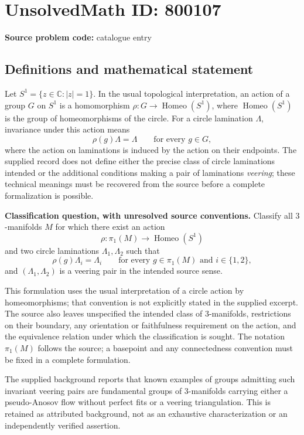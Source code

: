 \documentclass[11pt]{article}
\newcommand{\C}{\mathbb{C}}
\begin{document}
\section*{UnsolvedMath ID: 800107}
\textbf{Source problem code:} catalogue entry
\subsection{Definitions and mathematical statement}
Let \(S^1=\{z\in\C:|z|=1\}\). In the usual topological interpretation, an action of a group \(G\) on \(S^1\) is a homomorphism \(\rho:G\to\operatorname{Homeo}(S^1)\), where \(\operatorname{Homeo}(S^1)\) is the group of homeomorphisms of the circle. For a circle lamination \(\Lambda\), invariance under this action means
\[
\rho(g)\Lambda=\Lambda\qquad\text{for every }g\in G,
\]
where the action on laminations is induced by the action on their endpoints. The supplied record does not define either the precise class of circle laminations intended or the additional conditions making a pair of laminations \emph{veering}; these technical meanings must be recovered from the source before a complete formalization is possible.

\textbf{Classification question, with unresolved source conventions.} Classify all \(3\)-manifolds \(M\) for which there exist an action
\[
\rho:\pi_1(M)\longrightarrow\operatorname{Homeo}(S^1)
\]
and two circle laminations \(\Lambda_1,\Lambda_2\) such that
\[
\rho(g)\Lambda_i=\Lambda_i
\qquad\text{for every }g\in\pi_1(M)\text{ and }i\in\{1,2\},
\]
and \((\Lambda_1,\Lambda_2)\) is a veering pair in the intended source sense.

This formulation uses the usual interpretation of a circle action by homeomorphisms; that convention is not explicitly stated in the supplied excerpt. The source also leaves unspecified the intended class of \(3\)-manifolds, restrictions on their boundary, any orientation or faithfulness requirement on the action, and the equivalence relation under which the classification is sought. The notation \(\pi_1(M)\) follows the source; a basepoint and any connectedness convention must be fixed in a complete formulation.

The supplied background reports that known examples of groups admitting such invariant veering pairs are fundamental groups of \(3\)-manifolds carrying either a pseudo-Anosov flow without perfect fits or a veering triangulation. This is retained as attributed background, not as an exhaustive characterization or an independently verified assertion.
\end{document}
